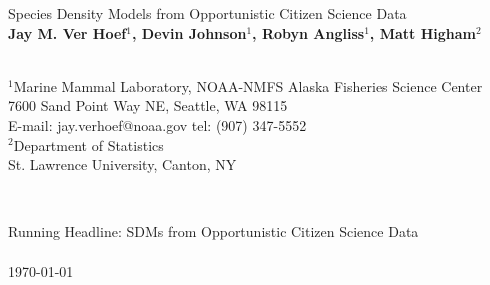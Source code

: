 \documentclass[11pt, titlepage]{article}
\begin{document}

\begin{titlepage}
  \begin{center}
\vspace*{2cm}
{\LARGE Species Density Models from Opportunistic Citizen Science Data} \\
\vspace{1cm}
\textbf{Jay M. Ver Hoef$^1$, Devin Johnson$^1$, Robyn Angliss$^1$, Matt Higham$^2$}  \\
\vspace{1cm}
\hrulefill \\ 
\begin{onehalfspace}
  \begin{flushleft}
$^1$Marine Mammal Laboratory, NOAA-NMFS Alaska Fisheries Science Center\\
\hspace{.5cm} 7600 Sand Point Way NE, Seattle, WA 98115\\
\hspace{.5cm} E-mail: jay.verhoef@noaa.gov \hspace{.5cm} tel: (907) 347-5552\\
$^2$Department of Statistics \\
\hspace{.5cm} St. Lawrence University, Canton, NY 
\end{flushleft}
\hrulefill \\
\end{onehalfspace}
\vspace{.5cm}
Running Headline: SDMs from Opportunistic Citizen Science Data \\
\hrulefill \\
\today
  \end{center}
\end{titlepage}

\modulolinenumbers[5]
\linenumbers{}
\end{document}
